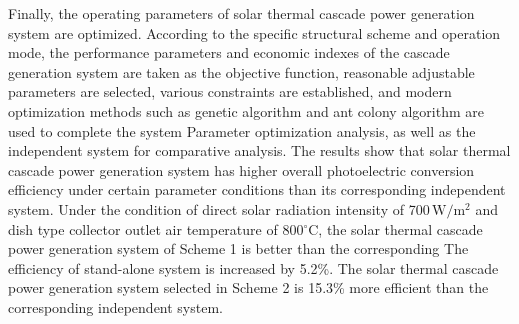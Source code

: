 Finally, the operating parameters of solar thermal cascade power generation system are optimized. According to the specific structural scheme and operation mode, the performance parameters and economic indexes of the cascade generation system are taken as the objective function, reasonable adjustable parameters are selected, various constraints are established, and modern optimization methods such as genetic algorithm and ant colony algorithm are used to complete the system Parameter optimization analysis, as well as the independent system for comparative analysis. The results show that solar thermal cascade power generation system has higher overall photoelectric conversion efficiency under certain parameter conditions than its corresponding independent system. Under the condition of direct solar radiation intensity of 700\,$\mathrm{W/m^2}$ and dish type collector outlet air temperature of 800$\mathrm{^\circ C}$, the solar thermal cascade power generation system of Scheme 1 is better than the corresponding The efficiency of stand-alone system is increased by 5.2\%. The solar thermal cascade power generation system selected in Scheme 2 is 15.3\% more efficient than the corresponding independent system.
